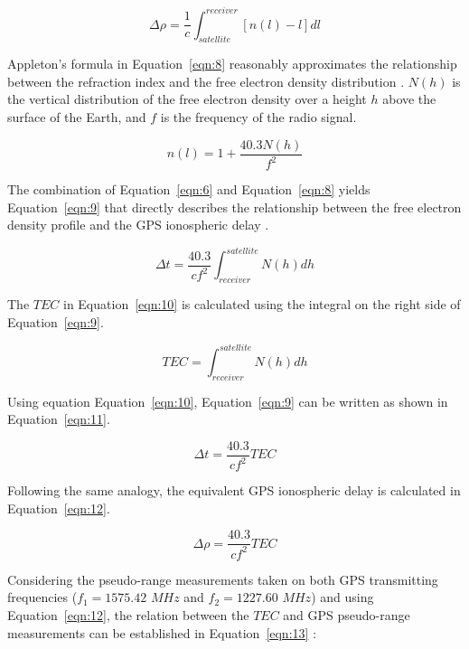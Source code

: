 \documentclass[sn-mathphys-num]{sn-jnl}%
\begin{document}
\begin{equation}
	\Delta \rho = \frac{1}{c} \int_{satellite}^{receiver} \left[ n(l) - l \right]dl
	\label{eqn:7}
\end{equation}

Appleton’s formula in Equation~\ref{eqn:8} reasonably approximates the relationship between the refraction index and the free electron density distribution \cite{davies1990ionospheric, spilker1996global}. $N(h)$ is the vertical distribution of the free electron density over a height $h$ above the surface of the Earth, and $f$ is the frequency of the radio signal.

\begin{equation}
	n(l) = 1 + \frac{40.3 N(h)}{f^{2}}
	\label{eqn:8}
\end{equation}

The combination of Equation~\ref{eqn:6} and Equation~\ref{eqn:8} yields Equation~\ref{eqn:9} that directly describes the relationship between the free electron density profile and the GPS ionospheric delay \cite{spilker1996global}.

\begin{equation}
	\Delta t = \frac{40.3}{c f^{2}} \int_{receiver}^{satellite} N(h)dh
	\label{eqn:9}
\end{equation}

The $TEC$ \cite{spilker1996global} in Equation~\ref{eqn:10} is calculated using the integral on the right side of Equation~\ref{eqn:9}.

\begin{equation}
	TEC = \int_{receiver}^{satellite} N(h)dh
	\label{eqn:10}
\end{equation}

Using equation Equation~\ref{eqn:10}, Equation~\ref{eqn:9} can be written as shown in Equation~\ref{eqn:11}.

\begin{equation}
	\Delta t = \frac{40.3}{c f^{2}} TEC
	\label{eqn:11}
\end{equation}

Following the same analogy, the equivalent GPS ionospheric delay is calculated in Equation~\ref{eqn:12}.

\begin{equation}
	\Delta \rho = \frac{40.3}{c f^{2}} TEC
	\label{eqn:12}
\end{equation}

Considering the pseudo-range measurements taken on both GPS transmitting frequencies ($f_{1}=1575.42$ $MHz$ and $f_{2}=1227.60$ $MHz$) and using Equation~\ref{eqn:12}, the relation between the $TEC$ and GPS pseudo-range measurements can be established in Equation~\ref{eqn:13} \cite{spilker1996global}:
 
\end{document}
